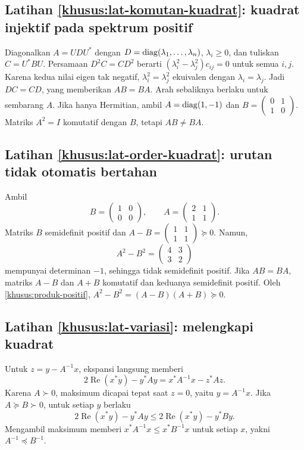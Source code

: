\subsection*{Latihan \ref{khusus:lat-komutan-kuadrat}: kuadrat injektif pada spektrum positif}
Diagonalkan $A=UDU^*$ dengan $D=\operatorname{diag}(\lambda_1,\ldots,\lambda_n)$,
$\lambda_i\ge0$, dan tuliskan $C=U^*BU$.
Persamaan $D^2C=CD^2$ berarti
$(\lambda_i^2-\lambda_j^2)c_{ij}=0$ untuk semua $i,j$.
Karena kedua nilai eigen tak negatif, $\lambda_i^2=\lambda_j^2$
ekuivalen dengan $\lambda_i=\lambda_j$.
Jadi $DC=CD$, yang memberikan $AB=BA$.
Arah sebaliknya berlaku untuk sembarang $A$.
Jika hanya Hermitian, ambil $A=\operatorname{diag}(1,-1)$ dan
$B=\begin{pmatrix}0&1\\1&0\end{pmatrix}$.
Matriks $A^2=I$ komutatif dengan $B$, tetapi $AB\ne BA$.

\subsection*{Latihan \ref{khusus:lat-order-kuadrat}: urutan tidak otomatis bertahan}
Ambil
\[
    B=\begin{pmatrix}1&0\\0&0\end{pmatrix},\qquad
    A=\begin{pmatrix}2&1\\1&1\end{pmatrix}.
\]
Matriks $B$ semidefinit positif dan
$A-B=\begin{pmatrix}1&1\\1&1\end{pmatrix}\succeq0$.
Namun,
\[
    A^2-B^2=\begin{pmatrix}4&3\\3&2\end{pmatrix}
\]
mempunyai determinan $-1$, sehingga tidak semidefinit positif.
Jika $AB=BA$, matriks $A-B$ dan $A+B$ komutatif dan keduanya
semidefinit positif. Oleh \autoref{khusus:produk-positif},
$A^2-B^2=(A-B)(A+B)\succeq0$.

\subsection*{Latihan \ref{khusus:lat-variasi}: melengkapi kuadrat}
Untuk $z=y-A^{-1}x$, ekspansi langsung memberi
\[
    2\operatorname{Re}(x^*y)-y^*Ay=x^*A^{-1}x-z^*Az.
\]
Karena $A\succ0$, maksimum dicapai tepat saat $z=0$, yaitu
$y=A^{-1}x$. Jika $A\succeq B\succ0$, untuk setiap $y$ berlaku
\[
    2\operatorname{Re}(x^*y)-y^*Ay
    \le 2\operatorname{Re}(x^*y)-y^*By.
\]
Mengambil maksimum memberi $x^*A^{-1}x\le x^*B^{-1}x$ untuk
setiap $x$, yakni $A^{-1}\preceq B^{-1}$.

